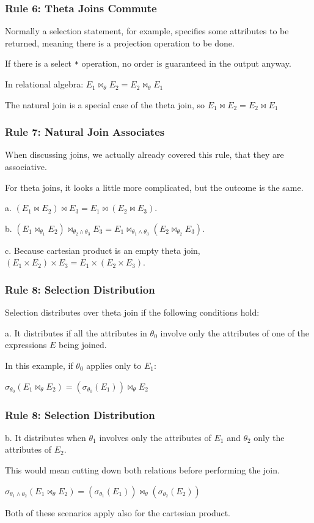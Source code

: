 \begin{frame}
\frametitle{Rule 6: Theta Joins Commute}

Normally a selection statement, for example, specifies some attributes to be returned, meaning there is a projection operation to be done. 

If there is a select \texttt{*} operation, no order is guaranteed in the output anyway.

In relational algebra: $E_{1} \bowtie_{\theta} E_{2} = E_{2} \bowtie_{\theta} E_{1}$

The natural join is a special case of the theta join, so $E_{1} \bowtie E_{2} = E_{2} \bowtie E_{1}$

\end{frame}

\begin{frame}
\frametitle{Rule 7: Natural Join Associates}

When discussing joins, we actually already covered this rule, that they are associative. 

For theta joins, it looks a little more complicated, but the outcome is the same.


a. $(E_{1} \bowtie E_{2}) \bowtie E_{3} = E_{1} \bowtie (E_{2} \bowtie E_{3})$. 

b. $(E_{1} \bowtie_{\theta_{1}} E_{2}) \bowtie_{\theta_{2}\wedge\theta_{3}} E_{3} = E_{1} \bowtie_{\theta_{1}\wedge\theta_{3}} (E_{2} \bowtie_{\theta_{2}} E_{3})$. 

c. Because cartesian product is an empty theta join, $(E_{1} \times E_{2}) \times E_{3} = E_{1} \times (E_{2} \times E_{3})$. 

\end{frame}


\begin{frame}
\frametitle{Rule 8: Selection Distribution}

Selection distributes over theta join if the following conditions hold:

a. It distributes if all the attributes in $\theta_{0}$ involve only the attributes of one of the expressions $E$ being joined. 

 In this example, if $\theta_{0}$ applies only to $E_{1}$:

$\sigma_{\theta_{0}}(E_{1} \bowtie_{\theta} E_{2}) = (\sigma_{\theta_{0}}(E_{1})) \bowtie_{\theta} E_{2}$ 


\end{frame}

\begin{frame}
\frametitle{Rule 8: Selection Distribution}

b. It distributes when $\theta_{1}$ involves only the attributes of $E_{1}$ and $\theta_{2}$ only the attributes of $E_{2}$. 

This would mean cutting down both relations before performing the join.

$\sigma_{\theta_{1}\wedge\theta_{2}} (E_{1} \bowtie_{\theta} E_{2}) = (\sigma_{\theta_{1}}(E_{1})) \bowtie_{\theta} (\sigma_{\theta_{2}}(E_{2})) $

Both of these scenarios apply also for the cartesian product.

\end{frame}


